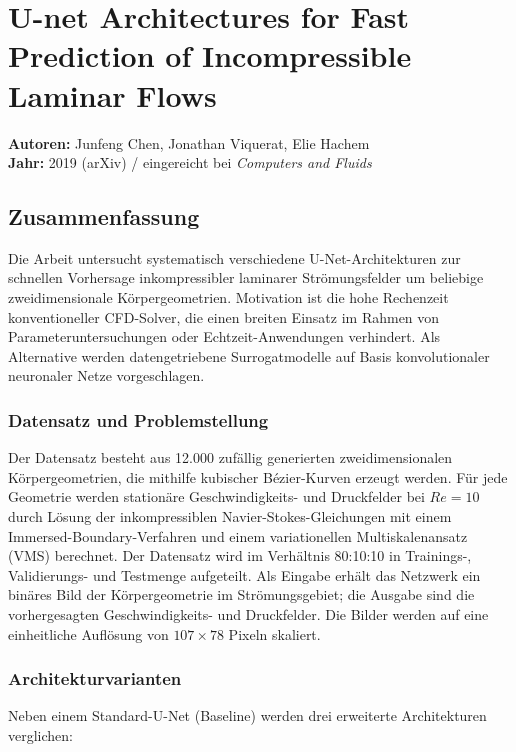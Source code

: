 \documentclass[a4paper,12pt]{article}
\begin{document}
\section*{U-net Architectures for Fast Prediction of Incompressible Laminar Flows}

\textbf{Autoren:} Junfeng Chen, Jonathan Viquerat, Elie Hachem \\
\textbf{Jahr:} 2019 (arXiv) / eingereicht bei \textit{Computers and Fluids}

\subsection*{Zusammenfassung}

Die Arbeit untersucht systematisch verschiedene U-Net-Architekturen zur schnellen Vorhersage inkompressibler laminarer Strömungsfelder um beliebige zweidimensionale Körpergeometrien. Motivation ist die hohe Rechenzeit konventioneller CFD-Solver, die einen breiten Einsatz im Rahmen von Parameteruntersuchungen oder Echtzeit-Anwendungen verhindert. Als Alternative werden datengetriebene Surrogatmodelle auf Basis konvolutionaler neuronaler Netze vorgeschlagen.

\subsubsection*{Datensatz und Problemstellung}

Der Datensatz besteht aus 12.000 zufällig generierten zweidimensionalen Körpergeometrien, die mithilfe kubischer Bézier-Kurven erzeugt werden. Für jede Geometrie werden stationäre Geschwindigkeits- und Druckfelder bei $Re = 10$ durch Lösung der inkompressiblen Navier-Stokes-Gleichungen mit einem Immersed-Boundary-Verfahren und einem variationellen Multiskalenansatz (VMS) berechnet. Der Datensatz wird im Verhältnis 80:10:10 in Trainings-, Validierungs- und Testmenge aufgeteilt. Als Eingabe erhält das Netzwerk ein binäres Bild der Körpergeometrie im Strömungsgebiet; die Ausgabe sind die vorhergesagten Geschwindigkeits- und Druckfelder. Die Bilder werden auf eine einheitliche Auflösung von $107 \times 78$ Pixeln skaliert.

\subsubsection*{Architekturvarianten}

Neben einem Standard-U-Net (Baseline) werden drei erweiterte Architekturen verglichen:
\end{document}
